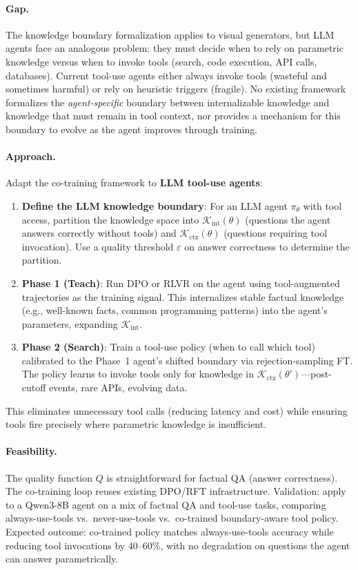 \documentclass[11pt,a4paper]{article}
\begin{document}
\paragraph{Gap.} The knowledge boundary formalization applies to visual generators, but LLM agents face an analogous problem: they must decide when to rely on parametric knowledge versus when to invoke tools (search, code execution, API calls, databases). Current tool-use agents either always invoke tools (wasteful and sometimes harmful) or rely on heuristic triggers (fragile). No existing framework formalizes the \emph{agent-specific} boundary between internalizable knowledge and knowledge that must remain in tool context, nor provides a mechanism for this boundary to evolve as the agent improves through training.

\paragraph{Approach.} Adapt the co-training framework to \textbf{LLM tool-use agents}:
\begin{enumerate}
\item \textbf{Define the LLM knowledge boundary}: For an LLM agent $\pi_\theta$ with tool access, partition the knowledge space into $\mathcal{K}_{\mathrm{int}}(\theta)$ (questions the agent answers correctly without tools) and $\mathcal{K}_{\mathrm{ctx}}(\theta)$ (questions requiring tool invocation). Use a quality threshold $\varepsilon$ on answer correctness to determine the partition.
\item \textbf{Phase 1 (Teach)}: Run DPO or RLVR on the agent using tool-augmented trajectories as the training signal. This internalizes stable factual knowledge (e.g., well-known facts, common programming patterns) into the agent's parameters, expanding $\mathcal{K}_{\mathrm{int}}$.
\item \textbf{Phase 2 (Search)}: Train a tool-use policy (when to call which tool) calibrated to the Phase~1 agent's shifted boundary via rejection-sampling FT. The policy learns to invoke tools only for knowledge in $\mathcal{K}_{\mathrm{ctx}}(\theta')$---post-cutoff events, rare APIs, evolving data.
\end{enumerate}
This eliminates unnecessary tool calls (reducing latency and cost) while ensuring tools fire precisely where parametric knowledge is insufficient.

\paragraph{Feasibility.} The quality function $Q$ is straightforward for factual QA (answer correctness). The co-training loop reuses existing DPO/RFT infrastructure. Validation: apply to a Qwen3-8B agent on a mix of factual QA and tool-use tasks, comparing always-use-tools vs.\ never-use-tools vs.\ co-trained boundary-aware tool policy. Expected outcome: co-trained policy matches always-use-tools accuracy while reducing tool invocations by 40--60\%, with no degradation on questions the agent can answer parametrically.
\end{document}
